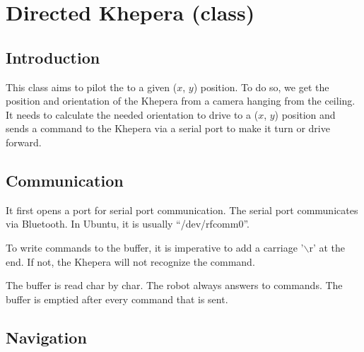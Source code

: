 \section{Directed Khepera (class)}
\label{sec:dk}

\subsection{Introduction}
\label{sec:dk:intro}

This class aims to pilot the \khepera{} to a given ($x$, $y$) position. 
To do 
so, we get the position and orientation of the Khepera from a camera 
hanging from the ceiling. It needs to calculate the needed orientation 
to drive to a ($x$, $y$) position and sends a command to the Khepera via a 
serial port to make it turn or drive forward.

\subsection{Communication}
\label{sec:dk:comm}

It first opens a port for serial port communication. The serial port 
communicates via Bluetooth. In Ubuntu, it is usually “/dev/rfcomm0”.

To write commands to the buffer, it is imperative to add a carriage '$\backslash$r' 
at the end. If not, the Khepera will not recognize the command. 

The buffer is read char by char. The robot always answers to commands. 
The buffer is emptied after every command that is sent.

\subsection{Navigation}
\label{sec:dk:nav}

 
